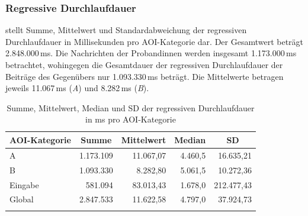 
\subsubsection{Regressive Durchlaufdauer}
\label{K6:subsubsec:regpd:DD}


\begin{sloppypar}
 stellt Summe, Mittelwert und Standardabweichung der regressiven Durchlaufdauer in Millisekunden pro AOI-Kategorie dar. Der Gesamtwert beträgt 2.848.000\,ms. Die Nachrichten der Proband{\textperiodcentered}innen werden insgesamt 1.173.000\,ms betrachtet, wohingegen die Gesamtdauer der regressiven Durchlaufdauer der Beiträge des Gegenübers nur 1.093.330\,ms beträgt. Die Mittelwerte betragen jeweils 11.067\,ms (\emph{A}) und 8.282\,ms (\emph{B}).
\end{sloppypar}

\vfill
\begin{table}[H]
    \begin{tabular}{lrrrr}
    \lsptoprule
        {AOI-Kategorie} & \multicolumn{1}{c}{Summe} & \multicolumn{1}{c}{Mittelwert} & \multicolumn{1}{c}{Median} &\multicolumn{1}{c}{SD} \\ 
        \midrule
        A   & 1.173.109 & 11.067,07 & 4.460,5 & 16.635,21 \\ 
        B   & 1.093.330 & 8.282,80 & 5.061,5 & 10.272,36 \\ 
        Eingabe   & 581.094 & 83.013,43 & 1.678,0 &  212.477,43 \\ 
        \midrule
        Global  & 2.847.533 & 11.622,58 & 4.797,0 & 37.924,73 \\ 
        \lspbottomrule
    \end{tabular}
    \caption[Summe, Mittelwert, Median und SD der regressiven Durchlaufdauer]
            {Summe, Mittelwert, Median und SD der regressiven Durchlaufdauer 
             in ms pro AOI-Kategorie\label{K6:tab:DeDe:mean-sd-iaregpd}}
\end{table}
\vfill\pagebreak


